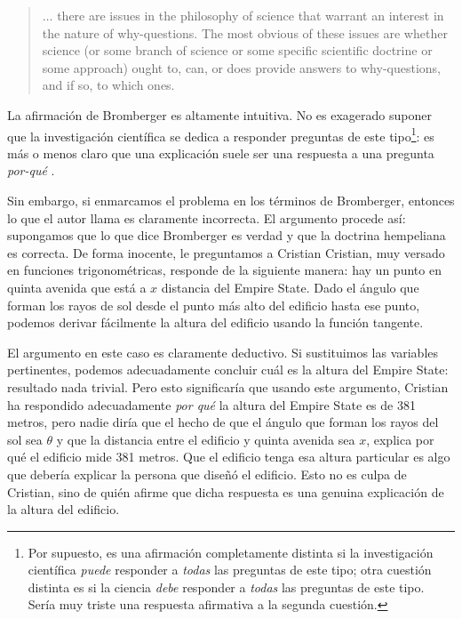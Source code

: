 	\begin{quote}
    $ \ldots $ there are issues in the philosophy of science
    that warrant an interest in the nature of why-questions.
    The most obvious of these issues are whether science (or
    some branch of science or some specific scientific
    doctrine or some approach) ought to, can, or does
    provide answers to why-questions, and if so, to which
    ones.
	\end{quote}

La afirmación de Bromberger es altamente intuitiva. No
es exagerado suponer que la investigación científica
se dedica a responder preguntas de este tipo\footnote{
  Por supuesto, es una afirmación	completamente distinta si
  la	investigación científica \emph{puede} responder a
  \emph{todas} las preguntas de este tipo; otra cuestión
  distinta es si la	ciencia \emph{debe} responder a
  \emph{todas} las preguntas de este tipo. Sería muy triste
  una respuesta afirmativa a la segunda cuestión.
}:
es más o menos claro que una explicación suele ser una
respuesta a una pregunta \emph{por-qué }.

Sin embargo, si  enmarcamos el problema en los términos de
Bromberger, entonces lo que el autor llama  es claramente incorrecta. El argumento procede
así: supongamos que lo que dice Bromberger es verdad y que
la doctrina hempeliana es correcta. De forma inocente, le
preguntamos a Cristian  Cristian, muy versado en
funciones trigonométricas, responde de la siguiente manera:
hay un punto en quinta  avenida que está a $ x $ distancia
del Empire State. Dado el ángulo que forman los rayos de sol
desde el punto más alto del edificio hasta ese punto,
podemos derivar fácilmente la altura del edificio usando la
función tangente.

El argumento en este caso es claramente deductivo. Si
sustituimos las variables pertinentes, podemos adecuadamente
concluir cuál es la altura del Empire State: resultado nada
trivial. Pero esto significaría que usando este argumento,
Cristian ha respondido adecuadamente \emph{por qué} la
altura del Empire State es de 381 metros, pero nadie diría
que el hecho de que el ángulo que forman los rayos del sol
sea $ \theta $ y que la distancia entre el edificio y quinta
avenida sea $ x $, explica por qué el edificio mide 381
metros. Que el edificio tenga esa altura particular es algo
que debería explicar la persona que diseñó el edificio. Esto
no es culpa de Cristian, sino de quién afirme que dicha
respuesta es una genuina explicación de la altura del
edificio.


